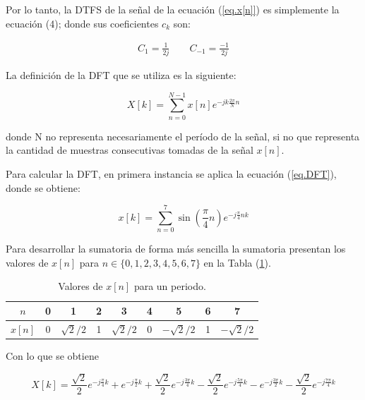 \documentclass{article}
\begin{document}
Por lo tanto, la DTFS de la señal de la ecuación (\ref{eq.x[n]}) es simplemente la ecuación (4); donde sus coeficientes $c_{k}$ son:

\begin{eqnarray}
C_{1}=\frac{1}{2j} \qquad C_{-1}=\frac{-1}{2j} \nonumber
\end{eqnarray}

La definición de la DFT que se utiliza es la siguiente:

\begin{equation}
X[k] = \sum_{n=0}^{N-1} x[n] e^{-jk \frac{2 \pi}{N} n}
\label{eq.DFT}
\end{equation}

donde N no representa necesariamente el período de la señal, si no que representa la cantidad de muestras consecutivas tomadas de la señal $x[n]$.


Para calcular la DFT, en primera instancia se aplica la ecuación (\ref{eq.DFT}), donde se obtiene: 

\begin{equation}
    x[k] = \sum_{n=0}^{7} \sin \left( \frac{\pi }{4} n \right) e^{-j\frac{\pi }{4}nk} 
\end{equation}

Para desarrollar la sumatoria de forma más sencilla la sumatoria presentan los valores de $x[n]$ para $n \in \{0, 1, 2, 3, 4 , 5, 6, 7\}$ en la 
Tabla (\ref{tab.xn}).

\begin{table}[H]
    \centering
    \begin{tabular}{|c|c|c|c|c|c|c|c|c|}
    \hline
    $n$    & 0 & 1                             & 2 & 3                             & 4 & 5                              & 6 & 7                              \\ \hline
    $x[n]$ & 0 & $\sqrt{2}/2$ & 1 & $\sqrt{2}/2$ & 0 & $-\sqrt{2}/2$ & 1 & $-\sqrt{2}/2$ \\ \hline
    \end{tabular}
    \caption{Valores de $x[n]$ para un periodo.}
    \label{tab.xn}
    \end{table}

Con lo que se obtiene 

\begin{equation}
    X[k]= \frac{\sqrt{2}}{2} e^{-j\frac{\pi }{4}k} + e^{-j\frac{\pi }{2}k} + \frac{\sqrt{2}}{2} e^{-j\frac{3\pi }{4}k}
    - \frac{\sqrt{2}}{2} e^{-j\frac{5\pi }{4}k} - e^{-j\frac{3\pi }{2}k} - \frac{\sqrt{2}}{2} e^{-j\frac{7\pi }{4}k} 
\end{equation}
\end{document}
